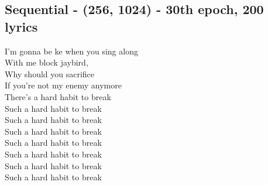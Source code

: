 \documentclass[conference]{IEEEtran}
\begin{document}
\subsection{Sequential - (256, 1024) - 30th epoch, 200 lyrics}\label{Sequential256_1024_200}
I'm gonna be ke when you sing along \\
With me block jaybird, \\
Why should you sacrifice \\
If you're not my enemy anymore \\
There's a hard habit to break \\
Such a hard habit to break \\
Such a hard habit to break \\
Such a hard habit to break \\
Such a hard habit to break \\
Such a hard habit to break \\
Such a hard habit to break \\
Such a hard habit to break \\
\end{document}
